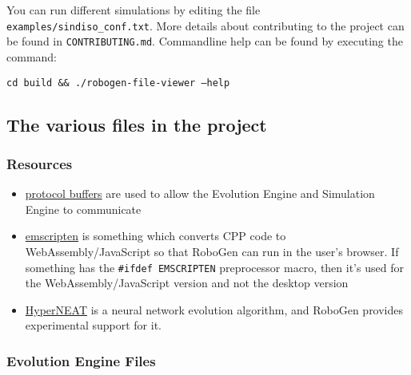 You can run different simulations by editing the file
\texttt{examples/sindiso\_conf.txt}. More details about contributing to the
project can be found in \texttt{CONTRIBUTING.md}. Commandline help can be found
by executing the command:

\texttt{cd build \&\& ./robogen-file-viewer --help}

\subsection{The various files in the project}
\hypertarget{resources}{%
\subsubsection{Resources}\label{resources}}

\begin{itemize}
\item
  \href{https://developers.google.com/protocol-buffers}{protocol
  buffers} are used to allow the Evolution Engine and Simulation Engine
  to communicate
\item
  \href{https://github.com/kripken/emscripten}{emscripten} is something
  which converts CPP code to WebAssembly/JavaScript so that RoboGen can
  run in the user's browser. If something has the
  \texttt{\#ifdef\ EMSCRIPTEN} preprocessor macro, then it's used for
  the WebAssembly/JavaScript version and not the desktop version
\item
  \href{https://github.com/peter-ch/MultiNEAT}{HyperNEAT} is a neural
  network evolution algorithm, and RoboGen provides experimental support
  for it.
\end{itemize}

\hypertarget{evolution-engine-files}{%
\subsubsection{Evolution Engine Files}\label{evolution-engine-files}}

